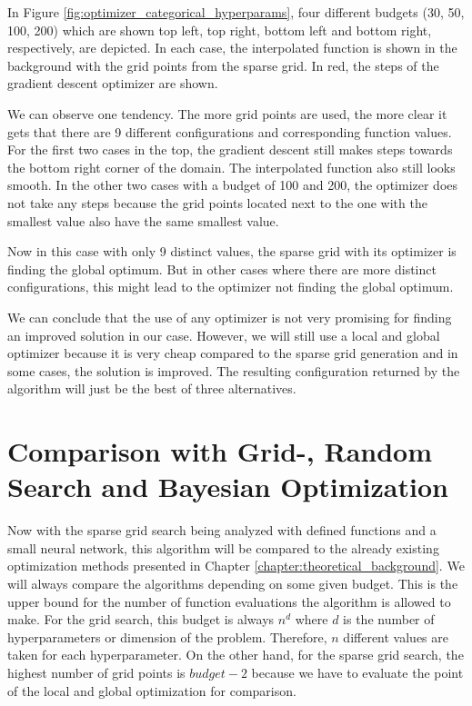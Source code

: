 In Figure \ref{fig:optimizer_categorical_hyperparams}, four different budgets (30, 50, 100, 200) which are shown top left, top right, bottom left and bottom right, respectively, are depicted. In each case, the interpolated function is shown in the background with the grid points from the sparse grid. In red, the steps of the gradient descent optimizer are shown. \newline 

We can observe one tendency. The more grid points are used, the more clear it gets that there are 9 different configurations and corresponding function values. For the first two cases in the top, the gradient descent still makes steps towards the bottom right corner of the domain. The interpolated function also still looks smooth. In the other two cases with a budget of 100 and 200, the optimizer does not take any steps because the grid points located next to the one with the smallest value also have the same smallest value. \newline 

Now in this case with only 9 distinct values, the sparse grid with its optimizer is finding the global optimum. But in other cases where there are more distinct configurations, this might lead to the optimizer not finding the global optimum. \newline


We can conclude that the use of any optimizer is not very promising for finding an improved solution in our case. However, we will still use a local and global optimizer because it is very cheap compared to the sparse grid generation and in some cases, the solution is improved. The resulting configuration returned by the algorithm will just be the best of three alternatives. \newline


\section{Comparison with Grid-, Random Search and Bayesian Optimization}

Now with the sparse grid search being analyzed with defined functions and a small neural network, this algorithm will be compared to the already existing optimization methods presented in Chapter \ref{chapter:theoretical_background}. We will always compare the algorithms depending on some given budget. This is the upper bound for the number of function evaluations the algorithm is allowed to make. For the grid search, this budget is always $ n^d $ where $ d $ is the number of hyperparameters or dimension of the problem. Therefore, $ n $ different values are taken for each hyperparameter. On the other hand, for the sparse grid search, the highest number of grid points is $ budget - 2 $ because we have to evaluate the point of the local and global optimization for comparison. \newline 

